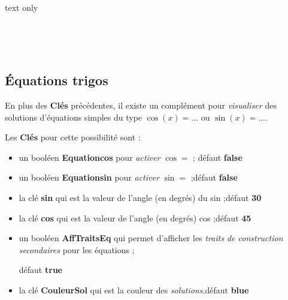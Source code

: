 \documentclass[a4paper,french,11pt]{article}
\newcommand\cmaj[1]{%
	{\tcbox[vignetteMaJ]{#1}\xspace}%
}
\newcommand\Cle[1]{{\bfseries\sffamily\textlangle \textcolor{orange!75!black}{#1}\textrangle}}
\begin{document}
\begin{PresCodeSortiePL}{text only}
\begin{center}
	\begin{tikzpicture}[line join=bevel]
			\CercleTrigo[Rayon=2.5,AffValeurs=false,Decal=8pt]
		\end{tikzpicture}
	~~~~
	\begin{tikzpicture}[line join=bevel]
			\CercleTrigo[Rayon=2.5,AffAngles=false]
		\end{tikzpicture}
	~~~~
	\begin{tikzpicture}[line join=bevel]
			\CercleTrigo[Rayon=2.5,MoinsPi=false,CouleurFond=orange!15,TailleValeurs=\tiny]
		\end{tikzpicture}
\end{center}
\end{PresCodeSortiePL}

\subsection{Équations trigos}

\begin{noteblock}
En plus des \Cle{Clés} précédentes, il existe un complément pour \textit{visualiser} des solutions d'équations simples du type $\cos(x)=\ldots$ ou $\sin(x)=\ldots$.
\end{noteblock}

\begin{cautionblock}
Les \Cle{Clés} pour cette possibilité sont :

\begin{itemize}
	\item un booléen \Cle{Equationcos} pour \textit{activer} \og $\cos=$ \fg; \hfill{}défaut \Cle{false}
	\item un booléen \Cle{Equationsin} pour \textit{activer} \og $\sin=$ \fg;\hfill{}défaut \Cle{false}
	\item la clé \Cle{sin} qui est la valeur de l'angle (en degrés) du sin ;\hfill{}défaut \Cle{30}
	\item la clé \Cle{cos} qui est la valeur de l'angle (en degrés) cos ;\hfill{}défaut \Cle{45}
	\item \cmaj{2.6.2} un booléen \Cle{AffTraitsEq} qui permet d'afficher les \textit{traits de construction secondaires} pour les équations ;
	
	\hfill{}défaut \Cle{true}
	\item la clé \Cle{CouleurSol} qui est la couleur des \textit{solutions}.\hfill{}défaut \Cle{blue}
\end{itemize}
\vspace*{-\baselineskip}\leavevmode
\end{cautionblock}
\end{document}

